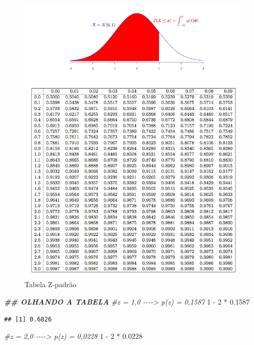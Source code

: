 \documentclass[
]{article}
\newenvironment{Shaded}{\begin{snugshade}}{\end{snugshade}}
\newcommand{\CommentTok}[1]{\textcolor[rgb]{0.56,0.35,0.01}{\textit{#1}}}
\newcommand{\DecValTok}[1]{\textcolor[rgb]{0.00,0.00,0.81}{#1}}
\newcommand{\DocumentationTok}[1]{\textcolor[rgb]{0.56,0.35,0.01}{\textbf{\textit{#1}}}}
\newcommand{\FloatTok}[1]{\textcolor[rgb]{0.00,0.00,0.81}{#1}}
\newcommand{\SpecialCharTok}[1]{\textcolor[rgb]{0.00,0.00,0.00}{#1}}
\begin{document}
\begin{figure}
\centering
\includegraphics{normal-table.png}
\caption{Tabela Z-padrão}
\end{figure}

\begin{Shaded}
\begin{Highlighting}[]
\DocumentationTok{\#\# OLHANDO A TABELA}
\CommentTok{\#z = 1,0 {-}{-}{-}{-}\textgreater{} p(z) = 0,1587}
\DecValTok{1} \SpecialCharTok{{-}} \DecValTok{2} \SpecialCharTok{*} \FloatTok{0.1587}
\end{Highlighting}
\end{Shaded}

\begin{verbatim}
## [1] 0.6826
\end{verbatim}

\begin{Shaded}
\begin{Highlighting}[]
\CommentTok{\#z = 2,0 {-}{-}{-}{-}\textgreater{} p(z) = 0,0228}
\DecValTok{1} \SpecialCharTok{{-}} \DecValTok{2} \SpecialCharTok{*} \FloatTok{0.0228}
\end{Highlighting}
\end{Shaded}
\end{document}
